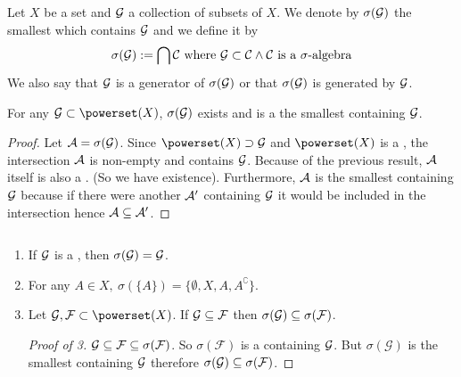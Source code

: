\begin{dfn}
	Let $X$ be a set and $\mathcal{G}$ a collection of subsets of $X$. We denote by $\sigma(\mathcal{G})$ the smallest \siga which contains $\mathcal{G}$ and we define it by
	\begin{align*}
		\sigma(\mathcal{G}) := \bigcap \mathcal{C}\text{ where } \mathcal{G} \subset \mathcal{C} \land \mathcal{C} \text{ is a } \sigma\text{-algebra}
	\end{align*}
	We also say that $\mathcal{G}$ is a generator of $\sigma(\mathcal{G})$ or that $\sigma(\mathcal{G})$ is generated by $\mathcal{G}$.
\end{dfn}

\begin{lem}
	For any $\calG \subset \powerset(X)$, $\sigma (\mathcal{G})$ exists and is a the smallest \siga containing $\mathcal{G}$.
\end{lem}

\begin{proof}
	Let $\mathcal{A} = \sigma(\mathcal{G})$. Since $\powerset(X) \supset \calG$ and $\powerset(X)$ is a \siga, the intersection $\mathcal{A}$ is non-empty and contains $\mathcal{G}$. Because of the previous result, $\mathcal{A}$ itself is also a \siga. (So we have existence). Furthermore, $\mathcal{A}$ is the smallest \siga containing $\mathcal{G}$ because if there were another \siga $\mathcal{A}'$ containing $\mathcal{G}$ it would be included in the intersection hence $\mathcal{A} \subseteq \mathcal{A}'$.
\end{proof}

\begin{remark}
	\label{rem:generators}
	$ $\newline
	\begin{enumerate}
		\item If $\mathcal{G}$ is a \siga, then $\sigma(\mathcal{G}) = \mathcal{G}$.
		\item For any $A \in X,\ \sigma(\{A\}) = \{\emptyset, X, A, A^\complement\}$.
		\item Let $\calG, \mathcal{F} \subset \powerset(X)$. If $\mathcal{G} \subseteq \mathcal{F}$ then $\sigma (\mathcal{G}) \subseteq \sigma(\mathcal{F})$.
		\begin{proof}[Proof of 3]
			$\mathcal{G} \subseteq \mathcal{F} \subseteq \sigma(\mathcal{F})$. So $\sigma(\mathcal{F})$ is a \siga containing $\mathcal{G}$. But $\sigma(\mathcal{G})$ is the smallest \siga containing $\mathcal{G}$ therefore $\sigma(\mathcal{G}) \subseteq \sigma(\mathcal{F})$.
		\end{proof}
	\end{enumerate}
\end{remark}

